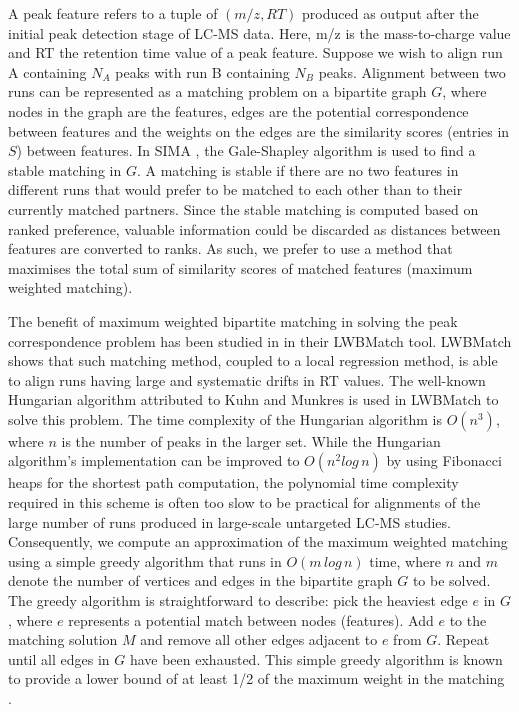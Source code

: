 A peak feature refers to a tuple of $(m/z,RT)$ produced as output after the initial peak detection stage of LC-MS data. Here, m/z is the mass-to-charge value and RT the retention time value of a peak feature. Suppose we wish to align run A containing $N_A$ peaks with run B containing $N_B$ peaks.  Alignment between two runs can be represented as a matching problem on a bipartite graph $G$, where nodes in the graph are the features, edges are the potential correspondence between features and the weights on the edges are the similarity scores (entries in $S$) between features. In SIMA \cite{Voss2011a}, the Gale-Shapley algorithm \cite{Gusfield1989} is used to find a stable matching in $G$. A matching is stable if there are no two features in different runs that would prefer to be matched to each other than to their currently matched partners. Since the stable matching is computed based on ranked preference, valuable information could be discarded as distances between features are converted to ranks. As such, we prefer to use a method that maximises the total sum of similarity scores of matched features (maximum weighted matching).

The benefit of maximum weighted bipartite matching in solving the peak correspondence problem has been studied in \cite{Wang2013} in their LWBMatch tool. LWBMatch shows that such matching method, coupled to a local regression method, is able to align runs having large and systematic drifts in RT values. The well-known Hungarian algorithm \cite{Kuhn1955} attributed to Kuhn and Munkres is used in LWBMatch to solve this problem. The time complexity of the Hungarian algorithm is $O(n^{3})$, where $n$ is the number of peaks in the larger set. While the Hungarian algorithm's implementation can be improved to $O(n^{2}log\, n)$ by using Fibonacci heaps for the shortest path computation, the polynomial time complexity required in this scheme is often too slow to be practical for alignments of the large number of runs produced in large-scale untargeted LC-MS studies. Consequently, we compute an approximation of the maximum weighted matching using a simple greedy algorithm that runs in $O(m\, log\, n)$ time, where $n$ and $m$ denote the number of vertices and edges in the bipartite graph $G$ to be solved. The greedy algorithm is straightforward to describe: pick the heaviest edge $e$ in $G$, where $e$ represents a potential match between nodes (features). Add $e$ to the matching solution $M$ and remove all other edges adjacent to $e$ from $G$. Repeat until all edges in $G$ have been exhausted. This simple greedy algorithm is known to provide a lower bound of at least 1/2 of the maximum weight in the matching \cite{Maximum2011}. 

